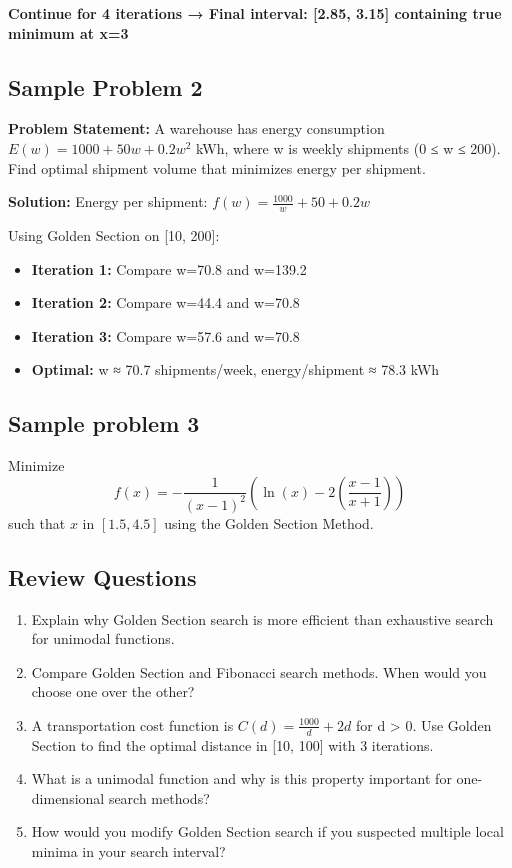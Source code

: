 \documentclass[
  letterpaper,
  DIV=11,
  numbers=noendperiod]{scrreprt}
\providecommand{\tightlist}{%
  \setlength{\itemsep}{0pt}\setlength{\parskip}{0pt}}
\begin{document}
\textbf{Continue for 4 iterations → Final interval: {[}2.85, 3.15{]}
containing true minimum at x=3}

\subsection{Sample Problem 2}\label{sample-problem-2}

\textbf{Problem Statement:} A warehouse has energy consumption
\(E(w) = 1000 + 50w + 0.2w^2\) kWh, where w is weekly shipments (0 ≤ w ≤
200). Find optimal shipment volume that minimizes energy per shipment.

\textbf{Solution:} Energy per shipment:
\(f(w) = \frac{1000}{w} + 50 + 0.2w\)

Using Golden Section on {[}10, 200{]}:

\begin{itemize}
\tightlist
\item
  \textbf{Iteration 1:} Compare w=70.8 and w=139.2
\item
  \textbf{Iteration 2:} Compare w=44.4 and w=70.8\\
\item
  \textbf{Iteration 3:} Compare w=57.6 and w=70.8
\item
  \textbf{Optimal:} w ≈ 70.7 shipments/week, energy/shipment ≈ 78.3 kWh
\end{itemize}

\subsection{Sample problem 3}\label{sample-problem-3}

Minimize
\[f(x)=-\frac{1}{(x-1)^2}\left(\ln(x)-2\left(\frac{x-1}{x+1}\right)\right)\]
such that \(x\) in \([1.5,4.5]\) using the Golden Section Method.

\subsection{Review Questions}\label{review-questions-3}

\begin{enumerate}
\def\labelenumi{\arabic{enumi}.}
\item
  Explain why Golden Section search is more efficient than exhaustive
  search for unimodal functions.
\item
  Compare Golden Section and Fibonacci search methods. When would you
  choose one over the other?
\item
  A transportation cost function is \(C(d) = \frac{1000}{d} + 2d\) for d
  \textgreater{} 0. Use Golden Section to find the optimal distance in
  {[}10, 100{]} with 3 iterations.
\item
  What is a unimodal function and why is this property important for
  one-dimensional search methods?
\item
  How would you modify Golden Section search if you suspected multiple
  local minima in your search interval?
\end{enumerate}
\end{document}
